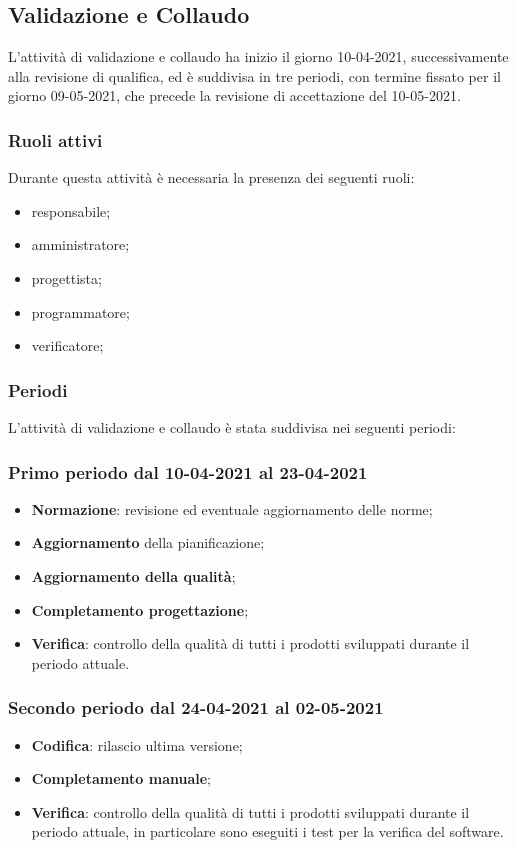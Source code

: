 	\newpage

	\subsection{Validazione e Collaudo}
	L’attività di validazione e collaudo ha inizio il giorno 10-04-2021, successivamente alla revisione di
	qualifica, ed è suddivisa in tre periodi, con termine fissato per il giorno 09-05-2021, che precede la
	revisione di accettazione del 10-05-2021.
	
	\subsubsection{Ruoli attivi}
	Durante questa attività è necessaria la presenza dei seguenti ruoli:
	\begin{itemize}
		\item responsabile;
		\item amministratore;
		\item progettista;
		\item programmatore;
		\item verificatore;
	\end{itemize}

	\subsubsection{Periodi}
	L’attività di validazione e collaudo è stata suddivisa nei seguenti periodi:
	\subsubsection{Primo periodo dal 10-04-2021 al 23-04-2021}
	\begin{itemize}
		\item \textbf{Normazione}: revisione ed eventuale aggiornamento delle norme;
		\item \textbf{Aggiornamento} della pianificazione;
		\item \textbf{Aggiornamento della qualità};
		\item \textbf{Completamento progettazione};
		\item \textbf{Verifica}: controllo della qualità di tutti i prodotti sviluppati durante il periodo attuale.
	\end{itemize}

	\subsubsection{Secondo periodo dal 24-04-2021 al 02-05-2021}
	\begin{itemize}
		\item \textbf{Codifica}: rilascio ultima versione;
		\item \textbf{Completamento manuale};
		\item \textbf{Verifica}: controllo della qualità di tutti i prodotti sviluppati durante il periodo attuale, in
		particolare sono eseguiti i test per la verifica del software.
	\end{itemize}

